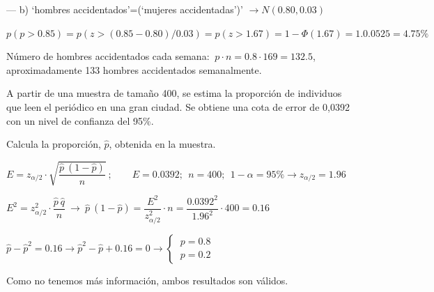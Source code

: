 \vspace{2mm} --- b) `hombres accidentados'=(`mujeres accidentadas')' $ \to N(0.80,0.03)$ 

\vspace{2mm} $p(p>0.85)=p(z>(0.85-0.80)/0.03)=p(z>1.67)=1-\Phi(1.67)=1.0.0525=4.75\%$

\vspace{2mm} Número de hombres accidentados cada semana: $\ p \cdot n=0.8\cdot 169 =132.5$, aproximadamente 133 hombres accidentados semanalmente.

\vspace{2mm} 

\vspace{2mm} 

\vspace{2mm} 


\vspace{5mm} %
\begin{ejemplo}
\begin{ejer}
	A partir de una muestra de tamaño 400, se estima la proporción de individuos que leen el periódico en una gran ciudad. Se obtiene una cota de error de 0,0392 con un nivel de confianza del 95\%. 

Calcula la proporción, $\hat p$, obtenida en la muestra. 
\end{ejer}	
\end{ejemplo}

\vspace{2mm} $E=z_{\alpha/2}\cdot \sqrt{\dfrac{\hat p \ (1-\hat p)}{n}} \ ; \qquad E=0.0392;\ \ n=400;\ \ 1-\alpha=95\% \to z_{\alpha/2}=1.96$

\vspace{2mm} $E^2=z_{\alpha/2}^2 \cdot \dfrac{\hat p \ \hat q}{n} \ \to \ \hat p \ (1-\hat p)=\dfrac {E^2}{z_{\alpha/2}^2}\cdot n =\dfrac{0.0392^2}{1.96^2}\cdot 400=0.16$ 

\vspace{2mm} $\hat p -\hat p^2=0.16 \to \hat p^2-\hat p +0.16=0 \to \begin{cases}
 \ p=0.8 \\ \ p=0.2	
 \end{cases}$


\vspace{2mm} Como no tenemos más información, ambos resultados son válidos.


